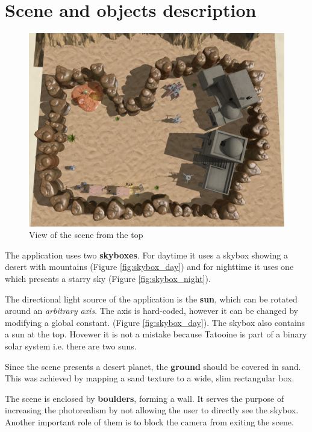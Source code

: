 \section{Scene and objects description}

\begin{figure}[ht]
    \centering
    \includegraphics[width=\linewidth]{img/top_view.png}
    \caption{View of the scene from the top}
    \label{fig:top}
\end{figure}

The application uses two \textbf{skyboxes}. For daytime it uses a skybox showing a desert with mountains (Figure \ref{fig:skybox_day}) and for nighttime it uses one which presents a starry sky (Figure \ref{fig:skybox_night}).

The directional light source of the application is the \textbf{sun}, which can be rotated around an \textit{arbitrary axis}. The axis is hard-coded, however it can be changed by modifying a global constant. (Figure \ref{fig:skybox_day}). The skybox also contains a sun at the top. Hovewer it is not a mistake because Tatooine is part of a binary solar system i.e. there are two suns.

Since the scene presents a desert planet, the \textbf{ground} should be covered in sand. This was achieved by mapping a sand texture to a wide, slim rectangular box.

The scene is enclosed by \textbf{boulders}, forming a wall. It serves the purpose of increasing the photorealism by not allowing the user to directly see the skybox. Another important role of them is to block the camera from exiting the scene.


